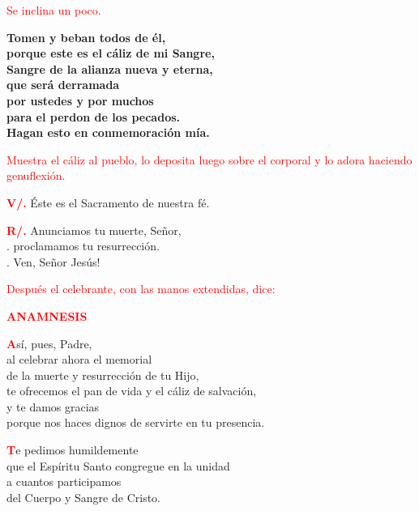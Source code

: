 \documentclass[12pt, letterpaper, spanish]{article}
\begin{document}
  \large{\textcolor{red}{Se inclina un poco.}}

  \noindent
  \LARGE{ \bfseries{ Tomen y beban todos de \'el,\\
  porque este es el c\'aliz de mi Sangre,\\
  Sangre de la alianza nueva y eterna,\\
  que ser\'a derramada\\
  por ustedes y por muchos\\
  para el perdon de los pecados.\\
  Hagan esto en conmemoraci\'on m\'ia.}}

  \large{\textcolor{red}{Muestra el c\'aliz al pueblo, lo deposita luego sobre el corporal y lo adora haciendo genuflexi\'on.}}

  \noindent
  \Large {\bfseries \textcolor{red}{V/.}} \hspace{0.5cm} \'Este es el Sacramento de nuestra f\'e.

  \noindent
  \Large {\bfseries \textcolor{red}{R/.}} \hspace{0.5cm} Anunciamos tu muerte, Se\~nor,\\
  . \hspace{1.5cm} proclamamos tu resurrecci\'on.\\
  . \hspace{1.5cm} Ven, Se\~nor Jes\'us!
  
  \clearpage

  \large{\textcolor{red}{Despu\'es el celebrante, con las manos extendidas, dice:}} 

  \Large {\bfseries \textcolor{red}{ANAMNESIS}}

  \lettrine[lines=2]{\bfseries \textcolor{red}{A}}{}\Large s\'i, pues, Padre,\\
  al celebrar ahora el memorial\\
  de la muerte y resurrecci\'on de tu Hijo,\\
  te ofrecemos el pan de vida y el c\'aliz de salvaci\'on,\\
  y te damos gracias\\
  porque nos haces dignos de servirte en tu presencia.

  \lettrine[lines=2]{\bfseries \textcolor{red}{T}}{}\Large e pedimos humildemente\\
  que el Esp\'iritu Santo congregue en la unidad\\
  a cuantos participamos\\
  del Cuerpo y Sangre de Cristo.
\end{document}

